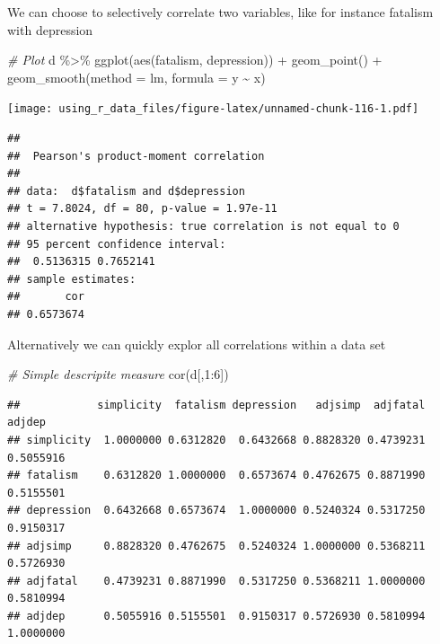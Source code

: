 \documentclass[
]{book}
\newenvironment{Shaded}{\begin{snugshade}}{\end{snugshade}}
\newcommand{\AttributeTok}[1]{\textcolor[rgb]{0.77,0.63,0.00}{#1}}
\newcommand{\CommentTok}[1]{\textcolor[rgb]{0.56,0.35,0.01}{\textit{#1}}}
\newcommand{\DecValTok}[1]{\textcolor[rgb]{0.00,0.00,0.81}{#1}}
\newcommand{\FunctionTok}[1]{\textcolor[rgb]{0.00,0.00,0.00}{#1}}
\newcommand{\NormalTok}[1]{#1}
\newcommand{\SpecialCharTok}[1]{\textcolor[rgb]{0.00,0.00,0.00}{#1}}
\newcommand{\StringTok}[1]{\textcolor[rgb]{0.31,0.60,0.02}{#1}}
\begin{document}
We can choose to selectively correlate two variables, like for instance fatalism with depression

\begin{Shaded}
\begin{Highlighting}[]
\CommentTok{\# Plot}
\NormalTok{d }\SpecialCharTok{\%\textgreater{}\%} 
  \FunctionTok{ggplot}\NormalTok{(}\FunctionTok{aes}\NormalTok{(fatalism, depression)) }\SpecialCharTok{+} 
  \FunctionTok{geom\_point}\NormalTok{() }\SpecialCharTok{+}
  \FunctionTok{geom\_smooth}\NormalTok{(}\AttributeTok{method =} \StringTok{\textquotesingle{}lm\textquotesingle{}}\NormalTok{, }\AttributeTok{formula =} \StringTok{\textquotesingle{}y \textasciitilde{} x\textquotesingle{}}\NormalTok{)}
\end{Highlighting}
\end{Shaded}

\texttt{[image: using\_r\_data\_files/figure-latex/unnamed-chunk-116-1.pdf]}

\begin{Shaded}
\end{Shaded}

\begin{verbatim}
## 
##  Pearson's product-moment correlation
## 
## data:  d$fatalism and d$depression
## t = 7.8024, df = 80, p-value = 1.97e-11
## alternative hypothesis: true correlation is not equal to 0
## 95 percent confidence interval:
##  0.5136315 0.7652141
## sample estimates:
##       cor 
## 0.6573674
\end{verbatim}

Alternatively we can quickly explor all correlations within a data set

\begin{Shaded}
\begin{Highlighting}[]
\CommentTok{\# Simple descripite measure}
\FunctionTok{cor}\NormalTok{(d[,}\DecValTok{1}\SpecialCharTok{:}\DecValTok{6}\NormalTok{])}
\end{Highlighting}
\end{Shaded}

\begin{verbatim}
##            simplicity  fatalism depression   adjsimp  adjfatal    adjdep
## simplicity  1.0000000 0.6312820  0.6432668 0.8828320 0.4739231 0.5055916
## fatalism    0.6312820 1.0000000  0.6573674 0.4762675 0.8871990 0.5155501
## depression  0.6432668 0.6573674  1.0000000 0.5240324 0.5317250 0.9150317
## adjsimp     0.8828320 0.4762675  0.5240324 1.0000000 0.5368211 0.5726930
## adjfatal    0.4739231 0.8871990  0.5317250 0.5368211 1.0000000 0.5810994
## adjdep      0.5055916 0.5155501  0.9150317 0.5726930 0.5810994 1.0000000
\end{verbatim}
\end{document}
